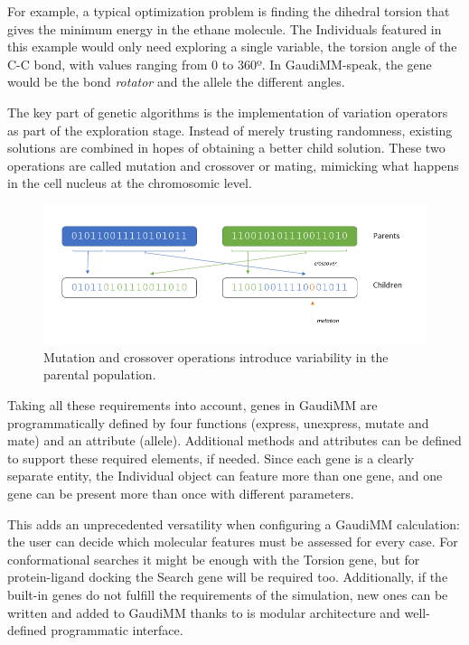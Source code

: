For example, a typical optimization problem is finding the dihedral torsion that gives the minimum energy in the ethane molecule. The Individuals featured in this example would only need exploring a single variable, the torsion angle of the C-C bond, with values ranging from 0 to 360º. In GaudiMM-speak, the gene would be the bond \textit{rotator} and the allele the different angles.

The key part of genetic algorithms is the implementation of variation operators as part of the exploration stage. Instead of merely trusting randomness, existing solutions are combined in hopes of obtaining a better child solution. These two operations are called mutation and crossover or mating, mimicking what happens in the cell nucleus at the chromosomic level.





\begin{figure}[H] %
	\includegraphics[width=\textwidth]{./figures/04/ga-crossover-mut.png}
	\caption[Mutation and crossover]{Mutation and crossover operations introduce variability in the parental population.}
	\label{fig:cxmut}
\end{figure}



Taking all these requirements into account, genes in GaudiMM are programmatically defined by four functions (express, unexpress, mutate and mate) and an attribute (allele). Additional methods and attributes can be defined to support these required elements, if needed. Since each gene is a clearly separate entity, the Individual object can feature more than one gene, and one gene can be present more than once with different parameters.

This adds an unprecedented versatility when configuring a GaudiMM calculation: the user can decide which molecular features must be assessed for every case. For conformational searches it might be enough with the Torsion gene, but for protein-ligand docking the Search gene will be required too. Additionally, if the built-in genes do not fulfill the requirements of the simulation, new ones can be written and added to GaudiMM thanks to is modular architecture and well-defined programmatic interface.

